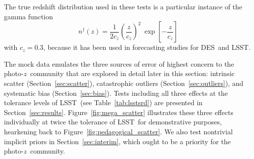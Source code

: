 \documentclass[iop]{emulateapj}
\newcommand{\todo}[3]{{\color{#2}\emph{#1}: #3}}
\newcommand{\aim}[1]{\todo{AIM}{red}{#1}}
\newcommand{\Sect}[1]{Section~\ref{#1}}
\newcommand{\Fig}[1]{Figure~\ref{#1}}
\newcommand{\project}[1]{\textsc{#1}}
\newcommand{\lsst}{\project{LSST}}
\newcommand{\des}{\project{DES}}
\newcommand{\pz}{photo-$z$}
\begin{document}
The true redshift distribution used in these tests is a particular instance of the gamma function
\begin{equation}
\label{eqn:gamma}
n^{\dagger}(z) = \frac{1}{2 c_{z}} \left(\frac{z}{c_{z}}\right)^{2}\ \exp\left[-\frac{z}{c_{z}}\right]
\end{equation}
with $c_{z} = 0.3$, because it has been used in forecasting studies for \des\ and \lsst.

The mock data emulates the three sources of error of highest concern to the \pz\ community that are explored in detail later in this section: intrinsic scatter (\Sect{sec:scatter}), catastrophic outliers (\Sect{sec:outliers}), and systematic bias (\Sect{sec:bias}).
Tests including all three effects at the tolerance levels of \lsst\ (see Table~\ref{tab:lsstsrd}) 
are presented in \Sect{sec:results}.
\Fig{fig:mega_scatter} illustrates these three effects individually at twice the tolerance of \lsst\ for demonstrative purposes, hearkening back to Figure~\ref{fig:pedagogical_scatter}.
We also test nontrivial implicit priors in \Sect{sec:interim}, which ought to be a priority for the \pz\ community.
\end{document}
